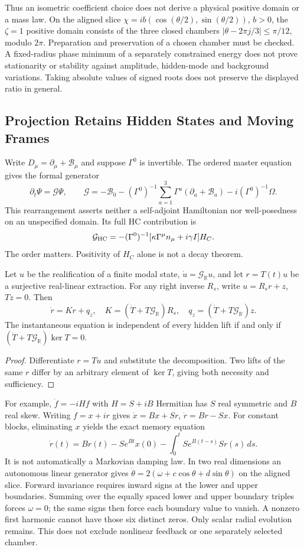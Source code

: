 Thus an isometric coefficient choice does not derive a physical
positive domain or a mass law. On the aligned slice
$\chi=ib(\cos(\theta/2),\sin(\theta/2))$, $b>0$, the
$\zeta=1$ positive domain consists of the three closed chambers
$|\theta-2\pi j/3|\leq\pi/12$, modulo $2\pi$.
Preparation and preservation of a chosen chamber must be checked.
A fixed-radius phase minimum of a separately constrained energy does
not prove stationarity or stability against amplitude, hidden-mode
and background variations. Taking absolute values of signed roots
does not preserve the displayed ratio in general.

\subsection{Projection Retains Hidden States and Moving Frames}

Write $D_\mu=\partial_\mu+\mathcal B_\mu$ and suppose
$\Gamma^0$ is invertible. The ordered master equation gives the
formal generator
\[
 \partial_t\Psi=\mathcal G\Psi,\qquad
 \mathcal G=-\mathcal B_0-(\Gamma^0)^{-1}
       \sum_{a=1}^3\Gamma^a(\partial_a+\mathcal B_a)
       -i(\Gamma^0)^{-1}\Omega.
\]
This rearrangement asserts neither a self-adjoint Hamiltonian nor
well-posedness on an unspecified domain. Its full HC contribution is
\[
 \mathcal G_{\rm HC}=-(\Gamma^0)^{-1}
       [\kappa\Gamma^\mu n_\mu+i\gamma I]H_C.
\]
The order matters. Positivity of $H_C$ alone is not a decay theorem.

\begin{proposition}
\label{v480:hc-projected-autonomy}
Let $u$ be the realification of a finite modal state,
$\dot u=\mathcal G_{\mathbb R}u$, and let $r=T(t)u$ be a
surjective real-linear extraction. For any right inverse $R_s$,
write $u=R_sr+z$, $Tz=0$. Then
\[
 \dot r=K r+q_z,\quad
 K=(\dot T+T\mathcal G_{\mathbb R})R_s,\quad
 q_z=(\dot T+T\mathcal G_{\mathbb R})z.
\]
The instantaneous equation is independent of every hidden lift if and
only if $(\dot T+T\mathcal G_{\mathbb R})\ker T=0$.
\end{proposition}
\begin{proof}
Differentiate $r=Tu$ and substitute the decomposition. Two lifts of
the same $r$ differ by an arbitrary element of $\ker T$, giving
both necessity and sufficiency.
\end{proof}

For example, $\dot f=-iHf$ with $H=S+iB$ Hermitian has
$S$ real symmetric and $B$ real skew. Writing $f=x+ir$ gives
$\dot x=Bx+Sr$, $\dot r=Br-Sx$. For constant blocks, eliminating
$x$ yields the exact memory equation
\[
 \dot r(t)=Br(t)-Se^{Bt}x(0)
  -\int_0^t Se^{B(t-s)}S r(s)\,ds.
\]
It is not automatically a Markovian damping law. In two real
dimensions an autonomous linear generator gives
$\dot\theta=2(\omega+c\cos\theta+d\sin\theta)$ on the aligned
slice. Forward invariance requires inward signs at the lower and upper
boundaries. Summing over the equally spaced lower and upper boundary
triples forces $\omega=0$; the same signs then force each boundary
value to vanish. A nonzero first harmonic cannot have those six
distinct zeros. Only scalar radial evolution remains. This does not
exclude nonlinear feedback or one separately selected chamber.

